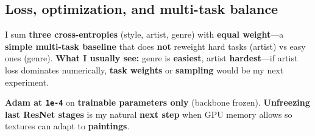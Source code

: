 \documentclass[11pt]{article}
\begin{document}
    \subsection{Loss, optimization, and multi-task
balance}\label{loss-optimization-and-multi-task-balance}

I sum \textbf{three cross-entropies} (style, artist, genre) with
\textbf{equal weight}---a \textbf{simple multi-task baseline} that does
\textbf{not} reweight hard tasks (artist) vs easy ones (genre).
\textbf{What I usually see:} genre is \textbf{easiest}, artist
\textbf{hardest}---if artist loss dominates numerically, \textbf{task
weights} or \textbf{sampling} would be my next experiment.

\textbf{Adam at \texttt{1e-4}} on \textbf{trainable parameters only}
(backbone frozen). \textbf{Unfreezing last ResNet stages} is my natural
\textbf{next step} when GPU memory allows so textures can adapt to
\textbf{paintings}.
\end{document}
